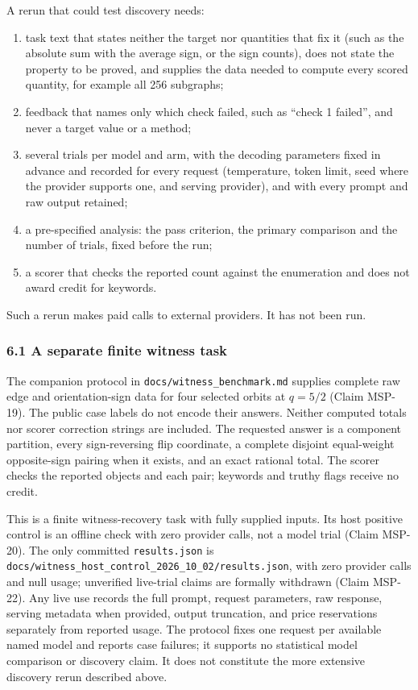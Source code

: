 \documentclass[
  11pt,
]{article}
\newcommand{\passthrough}[1]{#1}
\providecommand{\tightlist}{%
  \setlength{\itemsep}{0pt}\setlength{\parskip}{0pt}}
\begin{document}
A rerun that could test discovery needs:

\begin{enumerate}
\def\labelenumi{\arabic{enumi}.}
\tightlist
\item
  task text that states neither the target nor quantities that fix it
  (such as the absolute sum with the average sign, or the sign counts),
  does not state the property to be proved, and supplies the data needed
  to compute every scored quantity, for example all 256 subgraphs;
\item
  feedback that names only which check failed, such as ``check 1
  failed'', and never a target value or a method;
\item
  several trials per model and arm, with the decoding parameters fixed
  in advance and recorded for every request (temperature, token limit,
  seed where the provider supports one, and serving provider), and with
  every prompt and raw output retained;
\item
  a pre-specified analysis: the pass criterion, the primary comparison
  and the number of trials, fixed before the run;
\item
  a scorer that checks the reported count against the enumeration and
  does not award credit for keywords.
\end{enumerate}

Such a rerun makes paid calls to external providers. It has not been
run.

\subsubsection{6.1 A separate finite witness
task}\label{a-separate-finite-witness-task}

The companion protocol in \nolinkurl{docs/witness_benchmark.md} supplies
complete raw edge and orientation-sign data for four selected orbits at
\(q = 5/2\) (Claim MSP-19). The public case labels do not encode their
answers. Neither computed totals nor scorer correction strings are
included. The requested answer is a component partition, every
sign-reversing flip coordinate, a complete disjoint equal-weight
opposite-sign pairing when it exists, and an exact rational total. The
scorer checks the reported objects and each pair; keywords and truthy
flags receive no credit.

This is a finite witness-recovery task with fully supplied inputs. Its
host positive control is an offline check with zero provider calls, not
a model trial (Claim MSP-20). The only committed
\passthrough{\lstinline!results.json!} is
\nolinkurl{docs/witness_host_control_2026_10_02/results.json}, with zero
provider calls and null usage; unverified live-trial claims are formally
withdrawn (Claim MSP-22). Any live use records the full prompt, request
parameters, raw response, serving metadata when provided, output
truncation, and price reservations separately from reported usage. The
protocol fixes one request per available named model and reports case
failures; it supports no statistical model comparison or discovery
claim. It does not constitute the more extensive discovery rerun
described above.
\end{document}
